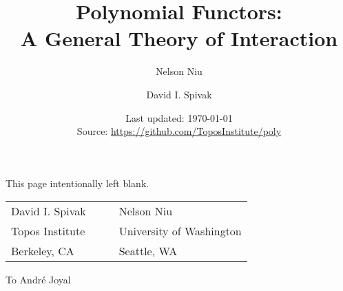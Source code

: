 \documentclass[11pt, book]{memoir}
\newcommand{\titlefont}{\normalfont\Huge\bfseries}
\theoremstyle{plain}
\theoremstyle{plain}
\theoremstyle{remark}
\newcommand{\Cat}[1]{\mathbf{#1}}%
\newenvironment{dedication}
     {\hfill}
     {}
\newcommand{\poly}[1][]{#1\Cat{Poly}}
\newcommand{\0}{\textsf{0}}
\newcommand{\1}{\textsf{1}}
\newcommand{\2}{\textsf{2}}
\newcommand{\3}{\textsf{3}}
\newcommand{\4}{\textsf{4}}
\newcommand{\5}{\textsf{5}}
\newcommand{\6}{\textsf{6}}
\newcommand{\7}{\textsf{7}}
\newcommand{\8}{\textsf{8}}
\newcommand{\9}{\textsf{9}}
\begin{document}
\frontmatter



\title{\titlefont Polynomial Functors:\\\medskip
A General Theory of Interaction}

\author{
\LARGE Nelson Niu 
\and
\LARGE David I. Spivak 
\normalsize}

\posttitle{
\vspace{.8in}
\normalsize
\[
\coverpic
\]
  \vspace{.5in}
  \endgroup
}
\date{\vfill Last updated: \today \\ Source: \url{https://github.com/ToposInstitute/poly}}

\maketitle

\thispagestyle{empty}
\clearpage
This page intentionally left blank.
\clearpage
\clearpage

\mbox{}
\vspace{2in}
\begin{center}
\begin{tabular}{lll}
\LARGE David I. Spivak&~\hspace{.75in}~&\LARGE  Nelson Niu\\
\large Topos Institute&&\large University of Washington\\
\large Berkeley, CA&&\large Seattle, WA
\end{tabular}
\end{center}
\clearpage

\begin{dedication}
To Andr\'e Joyal
\end{dedication}

\clearpage
\tableofcontents*
\clearpage



\mainmatter




\appendix
\begingroup
\footnotesize

\backmatter

\printbibliography
\printindex
\end{document}
